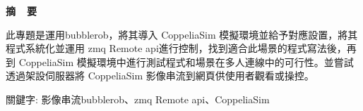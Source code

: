 \renewcommand{\baselinestretch}{1.5} %
\clearpage  %
\sectionef
{} %

\begin{center}
\LARGE\textbf{摘~~要}\\
\end{center}

\begin{flushleft}

\fontsize{14pt}{20pt}\sectionef\hspace{12pt}\quad 此專題是運用bubblerob，將其導入 CoppeliaSim 模擬環境並給予對應設置，將其程式系統化並運用 zmq Remote api進行控制，找到適合此場景的程式寫法後，再到 CoppeliaSim 模擬環境中進行測試程式和場景在多人連線中的可行性。並嘗試透過架設伺服器將 CoppeliaSim 影像串流到網頁供使用者觀看或操控。


\end{flushleft}

\begin{center}
\fontsize{14pt}{20pt}\selectfont 關鍵字: 影像串流\sectionef bubblerob、zmq Remote api、CoppeliaSim
\end{center}
